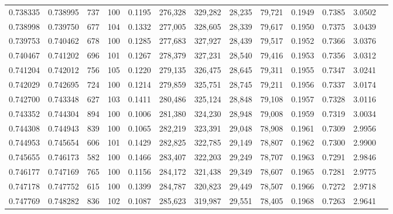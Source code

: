 \begin{tabular}{rrrrrrrrrrrrr}
0.738335 & 0.738995 &   737 & 100 &                                     0.1195 & 276,328 & 329,282 &  28,235 &  79,721 & 0.1949 & 0.7385 & 3.0502 \\
0.738998 & 0.739750 &   677 & 104 &                                     0.1332 & 277,005 & 328,605 &  28,339 &  79,617 & 0.1950 & 0.7375 & 3.0439 \\
0.739753 & 0.740462 &   678 & 100 &                                     0.1285 & 277,683 & 327,927 &  28,439 &  79,517 & 0.1952 & 0.7366 & 3.0376 \\
0.740467 & 0.741202 &   696 & 101 &                                     0.1267 & 278,379 & 327,231 &  28,540 &  79,416 & 0.1953 & 0.7356 & 3.0312 \\
0.741204 & 0.742012 &   756 & 105 &                                     0.1220 & 279,135 & 326,475 &  28,645 &  79,311 & 0.1955 & 0.7347 & 3.0241 \\
0.742029 & 0.742695 &   724 & 100 &                                     0.1214 & 279,859 & 325,751 &  28,745 &  79,211 & 0.1956 & 0.7337 & 3.0174 \\
0.742700 & 0.743348 &   627 & 103 &                                     0.1411 & 280,486 & 325,124 &  28,848 &  79,108 & 0.1957 & 0.7328 & 3.0116 \\
0.743352 & 0.744304 &   894 & 100 &                                     0.1006 & 281,380 & 324,230 &  28,948 &  79,008 & 0.1959 & 0.7319 & 3.0034 \\
0.744308 & 0.744943 &   839 & 100 &                                     0.1065 & 282,219 & 323,391 &  29,048 &  78,908 & 0.1961 & 0.7309 & 2.9956 \\
0.744953 & 0.745654 &   606 & 101 &                                     0.1429 & 282,825 & 322,785 &  29,149 &  78,807 & 0.1962 & 0.7300 & 2.9900 \\
0.745655 & 0.746173 &   582 & 100 &                                     0.1466 & 283,407 & 322,203 &  29,249 &  78,707 & 0.1963 & 0.7291 & 2.9846 \\
0.746177 & 0.747169 &   765 & 100 &                                     0.1156 & 284,172 & 321,438 &  29,349 &  78,607 & 0.1965 & 0.7281 & 2.9775 \\
0.747178 & 0.747752 &   615 & 100 &                                     0.1399 & 284,787 & 320,823 &  29,449 &  78,507 & 0.1966 & 0.7272 & 2.9718 \\
0.747769 & 0.748282 &   836 & 102 &                                     0.1087 & 285,623 & 319,987 &  29,551 &  78,405 & 0.1968 & 0.7263 & 2.9641 \\

\end{tabular}
